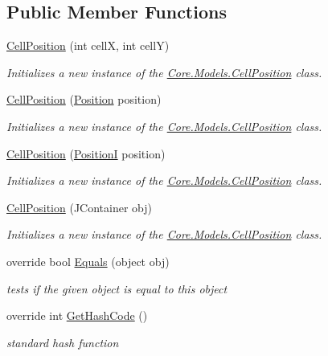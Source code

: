 \subsection*{Public Member Functions}
\begin{DoxyCompactItemize}
\item 
\hyperlink{classCore_1_1Models_1_1CellPosition_a41b20ccc07f94d036b2aafe9e1830aff}{Cell\+Position} (int cell\+X, int cell\+Y)
\begin{DoxyCompactList}\small\item\em Initializes a new instance of the \hyperlink{classCore_1_1Models_1_1CellPosition}{Core.\+Models.\+Cell\+Position} class. \end{DoxyCompactList}\item 
\hyperlink{classCore_1_1Models_1_1CellPosition_a6ed85706fc84bcfd93af2efddfebe968}{Cell\+Position} (\hyperlink{classCore_1_1Models_1_1Position}{Position} position)
\begin{DoxyCompactList}\small\item\em Initializes a new instance of the \hyperlink{classCore_1_1Models_1_1CellPosition}{Core.\+Models.\+Cell\+Position} class. \end{DoxyCompactList}\item 
\hyperlink{classCore_1_1Models_1_1CellPosition_ae5a3eb2be34e2e06b8c0addc808e902e}{Cell\+Position} (\hyperlink{classCore_1_1Models_1_1PositionI}{Position\+I} position)
\begin{DoxyCompactList}\small\item\em Initializes a new instance of the \hyperlink{classCore_1_1Models_1_1CellPosition}{Core.\+Models.\+Cell\+Position} class. \end{DoxyCompactList}\item 
\hyperlink{classCore_1_1Models_1_1CellPosition_a13d336fb05024daba699cdfb71bd9df2}{Cell\+Position} (J\+Container obj)
\begin{DoxyCompactList}\small\item\em Initializes a new instance of the \hyperlink{classCore_1_1Models_1_1CellPosition}{Core.\+Models.\+Cell\+Position} class. \end{DoxyCompactList}\item 
override bool \hyperlink{classCore_1_1Models_1_1CellPosition_a376e5fafcf7d525796f0489710fdabc7}{Equals} (object obj)
\begin{DoxyCompactList}\small\item\em tests if the given object is equal to this object \end{DoxyCompactList}\item 
override int \hyperlink{classCore_1_1Models_1_1CellPosition_a29ab23b29f230954c4277b0f9ad74000}{Get\+Hash\+Code} ()
\begin{DoxyCompactList}\small\item\em standard hash function \end{DoxyCompactList}\end{DoxyCompactItemize}
